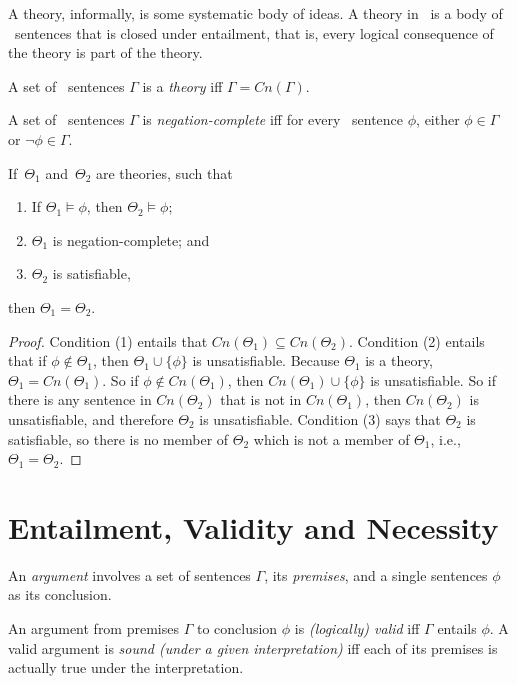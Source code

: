 A theory, informally, is some systematic body of ideas. A theory in \lone\ is a body of \lone\ sentences that is closed under entailment, that is, every logical consequence of the theory is part of the theory. 
 \begin{definition}[Theory]
A set of \lone\ sentences $\Gamma$ is a \emph{theory} iff $\Gamma = Cn(\Gamma)$.
\end{definition}
\begin{definition}
	A set of \lone\ sentences $\Gamma$ is \emph{negation-complete} iff for every \lone\ sentence $\phi$, either $\phi \in \Gamma$ or $\neg \phi \in \Gamma$.
\end{definition}
\begin{theorem}
If\, $\Theta_{1}$ and\, $\Theta_{2}$ are theories, such that \begin{enumerate}
	 	\item If $\Theta_{1} \vDash \phi$, then $\Theta_{2} \vDash \phi$;
	 	\item  $\Theta_{1}$ is negation-complete; and
	 	\item  $\Theta_{2}$ is satisfiable,
	 \end{enumerate}then $\Theta_{1}=\Theta_{2}$. 
\begin{proof}
Condition (1) entails that $Cn(\Theta_{1}) \subseteq Cn(\Theta_{2})$. Condition (2) entails that if $\phi \notin \Theta_{1}$, then $\Theta_{1} \cup \{\phi\}$ is unsatisfiable. Because $\Theta_{1}$ is a theory, $\Theta_{1} = Cn(\Theta_{1})$. So if $\phi \notin Cn(\Theta_{1})$, then $Cn(\Theta_{1}) \cup \{\phi\}$ is unsatisfiable. So if there is any sentence in $Cn(\Theta_{2})$ that is not in $Cn(\Theta_{1})$, then $Cn(\Theta_{2})$ is unsatisfiable, and therefore $\Theta_{2}$ is unsatisfiable. Condition (3) says that $\Theta_{2}$ is satisfiable, so there is no member of $\Theta_{2}$ which is not a member of $\Theta_{1}$, i.e., $\Theta_{1} = \Theta_{2}$.
\end{proof}
\end{theorem}

\section{Entailment, Validity and Necessity} An \emph{argument} involves a set of sentences $\Gamma$, its \emph{premises}, and a single sentences $\phi$ as its conclusion.
 \begin{definition}
 	An argument from premises $\Gamma$ to conclusion $\phi$ is \emph{(logically) valid} iff  $\Gamma$  entails $\phi$. A valid argument is \emph{sound (under a given interpretation)} iff each of its premises is actually true under the interpretation.
 \end{definition} 

